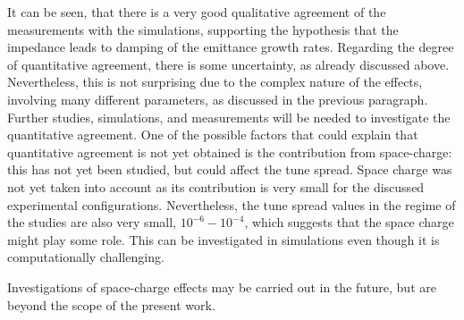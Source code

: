 It can be seen, that there is a very good qualitative agreement of the measurements with the simulations, supporting the hypothesis that the impedance leads to damping of the emittance growth rates. Regarding the degree of quantitative agreement, there is some uncertainty, as already discussed above. Nevertheless, this is not surprising due to the complex nature of the effects, involving many different parameters, as discussed in the previous paragraph. Further studies, simulations, and measurements will be needed to investigate the quantitative agreement. One of the possible factors that could explain that quantitative agreement is not yet obtained is the contribution from space-charge: this has not yet been studied, but could affect the tune spread. Space charge was not yet taken into account as its contribution is very small for the discussed experimental configurations. Nevertheless, the tune spread values in the regime of the studies are also very small, $10^{-6}-10^{-4}$, which suggests that the space charge might play some role. This can be investigated in simulations even though it is computationally challenging.


Investigations of space-charge effects may be carried out in the future, but are beyond the scope of the present work.


